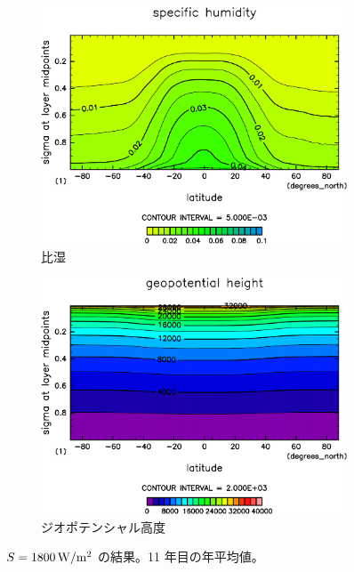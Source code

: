 \documentclass[body]{subfiles}
\begin{document}
\begin{figure}[t]
\begin{subfigure}{.4\textwidth}
		\includegraphics[width=\columnwidth]{S1800/QH2OVap,time=3650:4015-crop-rotate.pdf}
		\caption{比湿}\label{S1800比湿}
	\end{subfigure}
	\begin{subfigure}{.4\textwidth}
		\centering
		\includegraphics[width=\columnwidth]{S1800/Height,time=3650:4015-crop-rotate.pdf}
		\caption{ジオポテンシャル高度}\label{S1800ジオポテンシャル高度}
	\end{subfigure}
	\caption{
		\(S=1800\hmu{W/m^2}\) の結果。11 年目の年平均値。
	}\label{S1800}
\end{figure}
\end{document}
